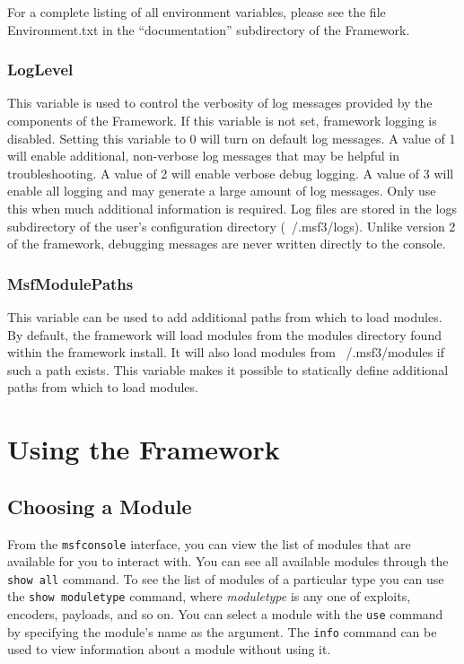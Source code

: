 \documentclass{report}
\begin{document}
\par
For a complete listing of all environment variables, please see the file
Environment.txt in the ``documentation'' subdirectory of the Framework.

	\subsection{LogLevel}
\par
This variable is used to control the verbosity of log messages provided
by the components of the Framework. If this variable is not set, framework
logging is disabled. Setting this variable to 0 will turn on default log
messages. A value of 1 will enable additional, non-verbose log messages that
may be helpful in troubleshooting. A value of 2 will enable verbose debug
logging. A value of 3 will enable all logging and may generate a large amount
of log messages. Only use this when much additional information is required.
Log files are stored in the logs subdirectory of the user's configuration
directory (~/.msf3/logs). Unlike version 2 of the framework, debugging
messages are never written directly to the console.

	\subsection{MsfModulePaths}
\par
This variable can be used to add additional paths from which to load modules.
By default, the framework will load modules from the modules directory found
within the framework install. It will also load modules from ~/.msf3/modules
if such a path exists. This variable makes it possible to statically define
additional paths from which to load modules.

\pagebreak

\chapter{Using the Framework}

	\section{Choosing a Module}
\par
From the \texttt{msfconsole} interface, you can view the list of modules that
are available for you to interact with. You can see all available modules
through the \texttt{show all} command. To see the list of modules of a
particular type you can use the \texttt{show moduletype} command, where
\textit{moduletype} is any one of exploits, encoders, payloads, and so on.
You can select a module with the \texttt{use} command by specifying the
module's name as the argument. The \texttt{info} command can be used to view
information about a module without using it.
\end{document}
